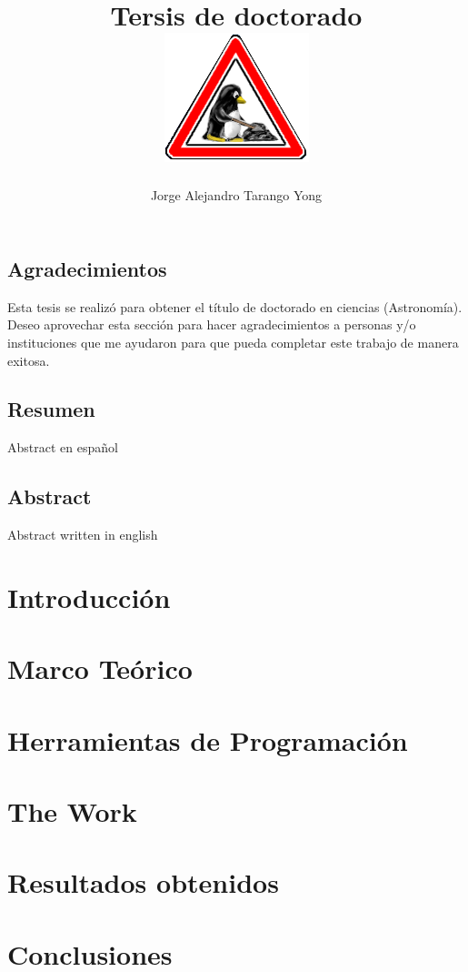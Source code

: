 \documentclass[10pt]{report}
\title{Tersis de doctorado\\
\includegraphics[width=0.7\linewidth]{./Figures/tux-development}
}
\author{Jorge Alejandro Tarango Yong}
\begin{document}
\maketitle


\tableofcontents
\newpage
\section*{Agradecimientos}

Esta tesis se realiz\'o para obtener el t\'itulo de doctorado en 
ciencias (Astronom\'ia). Deseo aprovechar esta secci\'on para hacer
agradecimientos a personas y/o instituciones que me ayudaron para que 
pueda completar este trabajo de manera exitosa.
\newpage
\section*{Resumen}
  Abstract en espa\~nol

\newpage
\section*{Abstract}
  Abstract written in english

\newpage
\chapter{Introducci\'on}

\chapter{Marco Te\'orico}

\chapter{Herramientas de Programaci\'on}

\chapter{The Work}

\chapter{Resultados obtenidos}

\chapter{Conclusiones}




\end{document}
